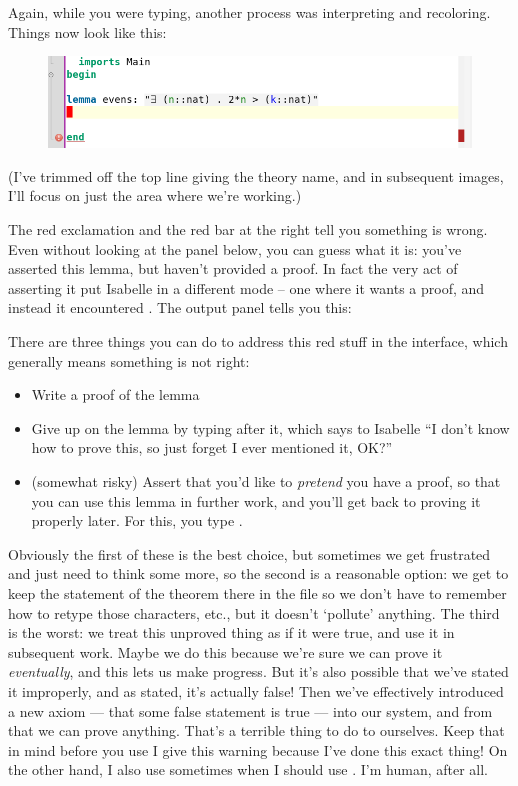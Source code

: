 Again, while you were typing, another process was interpreting and recoloring. Things now look like this:
\begin{figure}[h]
    \includegraphics[width=0.75\linewidth]{TEXT/C01/Images/unproved-lemma.png}
\end{figure}
\newpage
(I've trimmed off the top line giving the theory name, and in subsequent images, I'll focus on just the area where we're working.)

The red exclamation and the red bar at the right tell you something is wrong. Even without looking at the  panel below, you can guess what it is: you've asserted this lemma, but haven't provided a proof. In fact the very act of asserting it put Isabelle in a different mode -- one where it wants a proof, and instead it encountered . The output panel tells you this:

There are three things you can do to address this red stuff in the interface, which generally means something is not right:

\begin{itemize}
    \item Write a proof of the lemma
    \item Give up on the lemma by typing  after it, which says to Isabelle ``I don't know how to prove this, so just forget I ever mentioned it, OK?'' 
    \item  (somewhat risky) Assert that you'd like to \textit{pretend} you have a proof, so that you can use this lemma in further work, and you'll get back to proving it properly later. For this, you type .
\end{itemize}

Obviously the first of these is the best choice, but sometimes we get frustrated and just need to think some more, so the second is a reasonable option: we get to keep the statement of the theorem there in the file so we don't have to remember how to retype those characters, etc., but it doesn't `pollute' anything. The third is the worst: we treat this unproved thing as if it were true, and use it in subsequent work. Maybe we do this because we're sure we can prove it \textit{eventually}, and this lets us make progress. But it's also possible that we've stated it improperly, and as stated, it's actually false! Then we've effectively introduced a new axiom --- that some false statement is true --- into our system, and from that we can prove anything. That's a terrible thing to do to ourselves. Keep that in mind before you use  I give this warning because I've done this exact thing! On the other hand, I also use  sometimes when I should use . I'm human, after all. 

